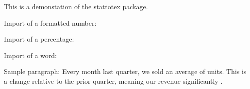 \documentclass{article}
\begin{document}
    This is a demonstation of the stattotex package.

    Import of a formatted number: \AvgMonthlySales

    Import of a percentage: \SaleIncPct

    Import of a word: \SaleDir

    Sample paragraph: Every month last quarter, we sold an average of \AvgMonthlySales \space units. This is a \SaleIncPct \space change relative to the prior quarter, meaning our revenue significantly \SaleDir.
\end{document}
